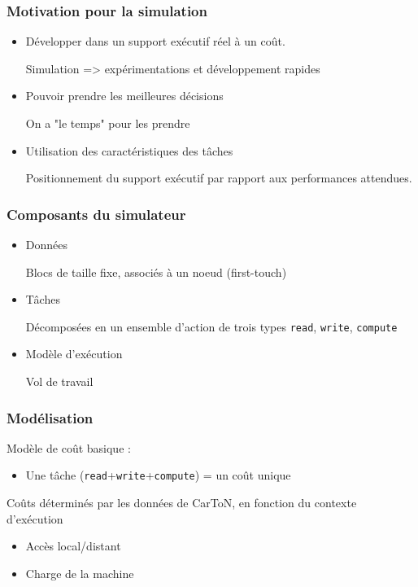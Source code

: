 \documentclass[xcolor={usenames,dvipsnames,svgnames,table}, aspectratio=43]{beamer}
\renewcommand{\emph}[1]{{\usebeamercolor[fg]{titlelike}#1}}
\begin{document}
\begin{frame}[fragile]
  \frametitle{Motivation pour la simulation}

  \begin{itemize}
    \item Développer dans un support exécutif réel à un coût.

      Simulation => expérimentations et développement rapides

    \item Pouvoir prendre les meilleures décisions

      On a "le temps" pour les prendre

    \item Utilisation des caractéristiques des tâches

      Positionnement du support exécutif par rapport aux performances attendues.
  \end{itemize}


\end{frame}

\begin{frame}[fragile]
  \frametitle{Composants du simulateur}
  \begin{itemize}
    \item Données

      Blocs de taille fixe, associés à un noeud (\emph{first-touch})

    \item Tâches

      Décomposées en un ensemble d'action de trois types \verb/read/, \verb/write/, \verb/compute/

    \item Modèle d'exécution

      Vol de travail
  \end{itemize}

\end{frame}

\begin{frame}[fragile]
  \frametitle{Modélisation}

  Modèle de coût basique :

  \begin{itemize}
    \item Une tâche (\verb/read/+\verb/write/+\verb/compute/) = un coût unique
  \end{itemize}

  Coûts déterminés par les données de CarToN, en fonction du contexte d'exécution
  \begin{itemize}
    \item Accès local/distant
    \item Charge de la machine
  \end{itemize}

\end{frame}
\end{document}
